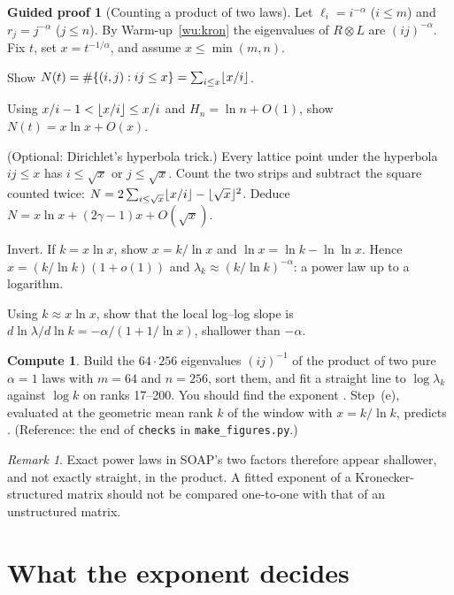 \documentclass[11pt,a4paper]{article}
\DeclarePairedDelimiter{\floor}{\lfloor}{\rfloor}
\theoremstyle{plain}
\theoremstyle{definition}
\newtheorem{guided}[proposition]{Guided proof}
\newtheorem{compute}[proposition]{Compute}
\theoremstyle{remark}
\newtheorem{remark}[proposition]{Remark}
\begin{document}
\begin{guided}[Counting a product of two laws]\label{gp:kron}
Let $\ell_i=i^{-\alpha}$ ($i\le m$) and $r_j=j^{-\alpha}$ ($j\le n$). By Warm-up~\ref{wu:kron} the eigenvalues of
$R\otimes L$ are $(ij)^{-\alpha}$. Fix $t$, set $x=t^{-1/\alpha}$, and assume $x\le\min(m,n)$.
\begin{steps}
\item Show $N(t)=\#\{(i,j):ij\le x\}=\sum_{i\le x}\floor{x/i}$.
\item Using $x/i-1<\floor{x/i}\le x/i$ and $H_n=\ln n+O(1)$, show $N(t)=x\ln x+O(x)$.
\item (Optional: Dirichlet's hyperbola trick.) Every lattice point under the hyperbola $ij\le x$ has $i\le\sqrt x$ or
  $j\le\sqrt x$. Count the two strips and subtract the square counted twice:
  $N=2\sum_{i\le\sqrt x}\floor{x/i}-\floor{\sqrt x}^2$. Deduce $N=x\ln x+(2\gamma-1)x+O(\sqrt x)$.
\item Invert. If $k=x\ln x$, show $x=k/\ln x$ and $\ln x=\ln k-\ln\ln x$. Hence $x=(k/\ln k)(1+o(1))$ and
  $\lambda_k\approx(k/\ln k)^{-\alpha}$: a power law up to a logarithm.
\item Using $k\approx x\ln x$, show that the local log--log slope is $d\ln\lambda/d\ln k=-\alpha/(1+1/\ln x)$,
  shallower than $-\alpha$.
\end{steps}
\end{guided}

\begin{compute}\label{cp:kron}
Build the $64\cdot256$ eigenvalues $(ij)^{-1}$ of the product of two pure $\alpha=1$ laws with $m=64$ and $n=256$,
sort them, and fit a straight line to $\log\lambda_k$ against $\log k$ on ranks 17--200. You should find the exponent
\NumKronSlope. Step~(e), evaluated at the geometric mean rank $k$ of the window with $x=k/\ln k$, predicts
\NumKronPred. (Reference: the end of \texttt{checks} in \texttt{make\_figures.py}.)
\end{compute}

\begin{remark}
Exact power laws in SOAP's two factors therefore appear shallower, and not exactly straight, in the product. A fitted
exponent of a Kronecker-structured matrix should not be compared one-to-one with that of an unstructured matrix.
\end{remark}

\section{What the exponent decides}\label{sec:controls}
\end{document}
